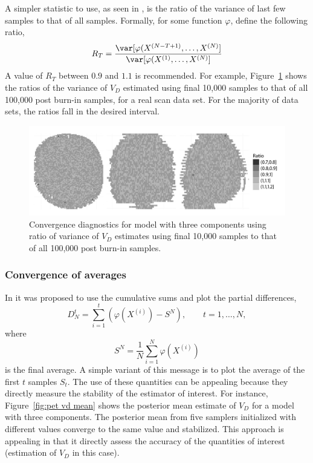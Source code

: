A simpler statistic to use, as seen in \cite{Gelman:2011vx}, is the ratio of
the variance of last few samples to that of all samples. Formally, for some
function $\varphi$, define the following ratio,
\begin{equation}
  R_T = \frac{\var[\varphi(X^{(N-T+1)},\dots,X^{(N)}]}
  {\var[\varphi(X^{(1)},\dots,X^{(N)}]}
\end{equation}
A value of $R_T$ between $0.9$ and $1.1$ is recommended. For example,
Figure~\ref{fig:pet diag ratio} shows the ratios of the variance of $V_D$
estimated using final 10,000 samples to that of all 100,000 post burn-in
samples, for a real \pet scan data set. For the majority of data sets, the
ratios fall in the desired interval.

\begin{figure}
  \includegraphics[width=\linewidth]{fig/PET_Converge}
  \caption{Convergence diagnostics for \pet model with three components using
    ratio of variance of $V_D$ estimates using final 10,000 samples to that of
    all 100,000 post burn-in samples.}
  \label{fig:pet diag ratio}
\end{figure}

\subsubsection{Convergence of averages}
\label{ssub:Convergence of averages}


In \cite{Yu:1998fn} it was proposed to use the cumulative sums and plot the
partial differences,
\begin{equation}
  D_N^t = \sum_{i=1}^t (\varphi(X^{(i)}) - S^N), \qquad t = 1,\dots,N,
\end{equation}
where
\begin{equation}
  S^N = \frac{1}{N}\sum_{i=1}^N \varphi(X^{(i)})
\end{equation}
is the final average. A simple variant of this message is to plot the average
of the first $t$ samples $S_t$. The use of these quantities can be appealing
because they directly measure the stability of the estimator of interest. For
instance, Figure~\ref{fig:pet vd mean} shows the posterior mean estimate of
$V_D$ for a \pet model with three components. The posterior mean from five
samplers initialized with different values converge to the same value and
stabilized. This approach is appealing in that it directly assess the accuracy
of the quantities of interest (estimation of $V_D$ in this case).


